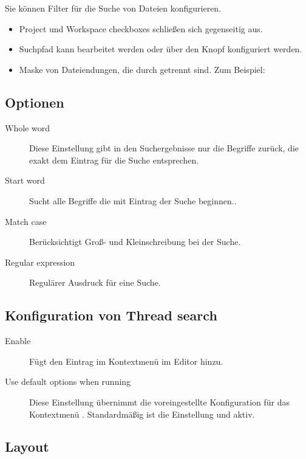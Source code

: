 
Sie können Filter für die Suche von Dateien konfigurieren.

\begin{itemize}
\item Project und Workspace checkboxes schließen sich gegenseitig aus.
\item Suchpfad kann bearbeitet werden oder über den Knopf  konfiguriert werden.
\item Maske von Dateiendungen, die durch \samp{;} getrennt sind. Zum Beispiel: 
\end{itemize}

\subsection{Optionen}

\begin{description}
\item[Whole word] Diese Einstellung gibt in den Suchergebnisse nur die Begriffe zurück, die exakt dem Eintrag für die Suche entsprechen.
\item[Start word] Sucht alle Begriffe die mit Eintrag der Suche beginnen..
\item[Match case] Berücksichtigt Groß- und Kleinschreibung bei der Suche.
\item[Regular expression] Regulärer Ausdruck für eine Suche.
\end{description}

\subsection{Konfiguration von Thread search}

\begin{description}
\item[Enable ] Fügt den Eintrag  im Kontextmenü im Editor hinzu.
\item[Use default options when running ] Diese Einstellung übernimmt die voreingestellte Konfiguration für das Kontextmenü . Standardmäßig ist die Einstellung  und  aktiv.
\end{description}

\subsection{Layout}

